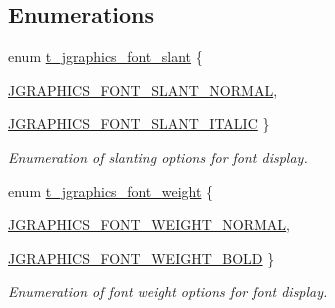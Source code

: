 \subsection*{Enumerations}
\begin{DoxyCompactItemize}
\item 
enum \hyperlink{group__jfont_gaea63403193677b088b56cb60c69c37b4}{t\_\-jgraphics\_\-font\_\-slant} \{ \par
\hyperlink{group__jfont_ggaea63403193677b088b56cb60c69c37b4a42c9269c412c5cfaf42db4db88add2a8}{JGRAPHICS\_\-FONT\_\-SLANT\_\-NORMAL}, 
\par
\hyperlink{group__jfont_ggaea63403193677b088b56cb60c69c37b4a66269b2de097def1c7d8100683cae0da}{JGRAPHICS\_\-FONT\_\-SLANT\_\-ITALIC}
 \}
\begin{DoxyCompactList}\small\item\em Enumeration of slanting options for font display. \item\end{DoxyCompactList}\item 
enum \hyperlink{group__jfont_ga29fc4356e11166a16aeae50dd5e22f86}{t\_\-jgraphics\_\-font\_\-weight} \{ \par
\hyperlink{group__jfont_gga29fc4356e11166a16aeae50dd5e22f86a9877f7707c8073709254be3d6429909a}{JGRAPHICS\_\-FONT\_\-WEIGHT\_\-NORMAL}, 
\par
\hyperlink{group__jfont_gga29fc4356e11166a16aeae50dd5e22f86aa12c9a0fb782696b77e2d991712e5761}{JGRAPHICS\_\-FONT\_\-WEIGHT\_\-BOLD}
 \}
\begin{DoxyCompactList}\small\item\em Enumeration of font weight options for font display. \item\end{DoxyCompactList}\end{DoxyCompactItemize}
